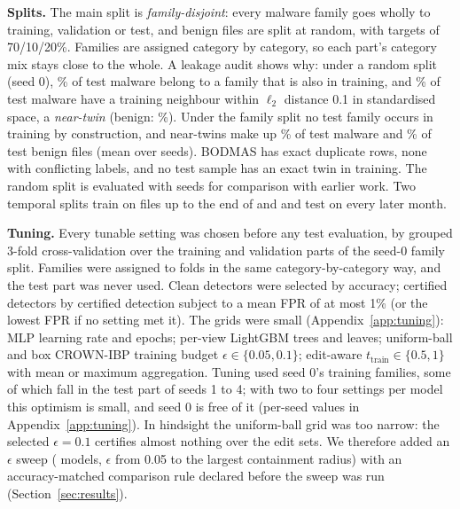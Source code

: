 \documentclass[preprint,12pt,authoryear]{elsarticle}
\begin{document}
\textbf{Splits.} The main split is \emph{family-disjoint}: every malware family goes wholly to training, validation or test, and benign files are split at random, with targets of 70/10/20\%. Families are assigned category by category, so each part's category mix stays close to the whole. A leakage audit shows why: under a random split (seed 0), \LeakRandFamOverlap\% of test malware belong to a family that is also in training, and \LeakRandNearMal\% of test malware have a training neighbour within $\ell_2$ distance 0.1 in standardised space, a \emph{near-twin} (benign: \LeakRandNearBen\%). Under the family split no test family occurs in training by construction, and near-twins make up \NearTwinFamMal\% of test malware and \NearTwinFamBen\% of test benign files (mean over \NSeedsFam{} seeds). BODMAS has \LeakDupRows{} exact duplicate rows, none with conflicting labels, and no test sample has an exact twin in training. The random split is evaluated with \NSeedsRand{} seeds for comparison with earlier work. Two temporal splits train on files up to the end of \TdCutA{} and \TdCutB{} and test on every later month.

\textbf{Tuning.} Every tunable setting was chosen before any test evaluation, by grouped 3-fold cross-validation over the training and validation parts of the seed-0 family split. Families were assigned to folds in the same category-by-category way, and the test part was never used. Clean detectors were selected by accuracy; certified detectors by certified detection subject to a mean FPR of at most 1\% (or the lowest FPR if no setting met it). The grids were small (Appendix~\ref{app:tuning}): MLP learning rate and epochs; per-view LightGBM trees and leaves; uniform-ball and box CROWN-IBP training budget $\epsilon\in\{0.05,0.1\}$; edit-aware $t_{\text{train}}\in\{0.5,1\}$ with mean or maximum aggregation. Tuning used seed 0's training families, some of which fall in the test part of seeds 1 to 4; with two to four settings per model this optimism is small, and seed 0 is free of it (per-seed values in Appendix~\ref{app:tuning}). In hindsight the uniform-ball grid was too narrow: the selected $\epsilon=0.1$ certifies almost nothing over the edit sets. We therefore added an $\epsilon$ sweep (\SwNModels{} models, $\epsilon$ from 0.05 to the largest containment radius) with an accuracy-matched comparison rule declared before the sweep was run (Section~\ref{sec:results}).
\end{document}
